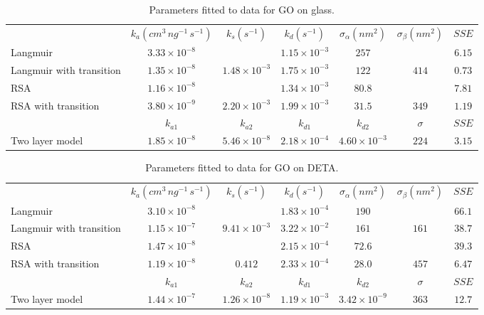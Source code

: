\begin{table}
\caption{\label{tab:GO params glass}Parameters fitted to data for GO on glass.}
\begin{tabular}{>{\raggedright}p{0.75in}cccccc}
 & $k_{a}\left(cm^{3}\, ng^{-1}\, s^{-1}\right)$ & $k_{s}\left(s^{-1}\right)$ & $k_{d}\left(s^{-1}\right)$ & $\sigma_{\alpha}\left(nm^{2}\right)$ & $\sigma_{\beta}\left(nm^{2}\right)$ & $SSE$\tabularnewline[\doublerulesep]
\cline{2-7} 
\noalign{\vskip\doublerulesep}
Langmuir & $3.33\times10^{-8}$ &  & $1.15\times10^{-3}$ & $257$ &  & $6.15$\tabularnewline
Langmuir with transition & $1.35\times10^{-8}$ & $1.48\times10^{-3}$ & $1.75\times10^{-3}$ & $122$ & $414$ & $0.73$\tabularnewline
\noalign{\vskip\doublerulesep}
RSA & $1.16\times10^{-8}$ &  & $1.34\times10^{-3}$ & $80.8$ &  & $7.81$\tabularnewline
\noalign{\vskip\doublerulesep}
RSA with transition & $3.80\times10^{-9}$ & $2.20\times10^{-3}$ & $1.99\times10^{-3}$ & $31.5$ & $349$ & $1.19$\tabularnewline
\noalign{\vskip\doublerulesep}
\noalign{\vskip\doublerulesep}
 & $k_{a1}$ & $k_{a2}$ & $k_{d1}$ & $k_{d2}$ & $\sigma$ & $SSE$\tabularnewline
Two layer model & $1.85\times10^{-8}$ & $5.46\times10^{-8}$ & $2.18\times10^{-4}$ & $4.60\times10^{-3}$ & $224$ & $3.15$\tabularnewline
\end{tabular}%
\end{table}
%
\begin{table}
\caption{\label{tab:GO params DETA}Parameters fitted to data for GO on DETA.}
\begin{tabular}{>{\raggedright}p{0.75in}cccccc}
 & $k_{a}\left(cm^{3}\, ng^{-1}\, s^{-1}\right)$ & $k_{s}\left(s^{-1}\right)$ & $k_{d}\left(s^{-1}\right)$ & $\sigma_{\alpha}\left(nm^{2}\right)$ & $\sigma_{\beta}\left(nm^{2}\right)$ & $SSE$\tabularnewline[\doublerulesep]
\cline{2-7} 
\noalign{\vskip\doublerulesep}
Langmuir & $3.10\times10^{-8}$ &  & $1.83\times10^{-4}$ & $190$ &  & $66.1$\tabularnewline
\noalign{\vskip\doublerulesep}
Langmuir with transition & $1.15\times10^{-7}$ & $9.41\times10^{-3}$ & $3.22\times10^{-2}$ & $161$ & $161$ & $38.7$\tabularnewline
\noalign{\vskip\doublerulesep}
RSA & $1.47\times10^{-8}$ &  & $2.15\times10^{-4}$ & $72.6$ &  & $39.3$\tabularnewline
\noalign{\vskip\doublerulesep}
RSA with transition & $1.19\times10^{-8}$ & $0.412$ & $2.33\times10^{-4}$ & $28.0$ & $457$ & $6.47$\tabularnewline
\noalign{\vskip\doublerulesep}
\noalign{\vskip\doublerulesep}
 & $k_{a1}$ & $k_{a2}$ & $k_{d1}$ & $k_{d2}$ & $\sigma$ & $SSE$\tabularnewline
\noalign{\vskip\doublerulesep}
Two layer model & $1.44\times10^{-7}$ & $1.26\times10^{-8}$ & $1.19\times10^{-3}$ & $3.42\times10^{-9}$ & $363$ & $12.7$\tabularnewline
\end{tabular}%
\end{table}
